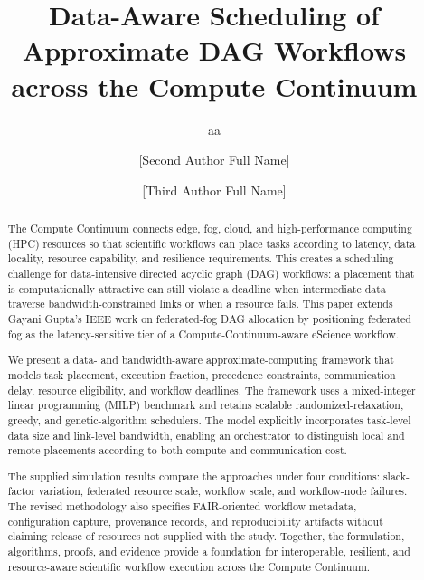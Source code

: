 \documentclass[a4paper,fleqn]{cas-dc}
\begin{document}
\let\WriteBookmarks\relax
\def\floatpagepagefraction{1}
\def\textpagefraction{.001}

\title[mode = title]{Data-Aware Scheduling of Approximate DAG Workflows across the Compute Continuum}

\author[1]{aa}
\cormark[1]

\author[1]{[Second Author Full Name]}

\author[2]{[Third Author Full Name]}


\begin{abstract}
The Compute Continuum connects edge, fog, cloud, and high-performance computing (HPC) resources so that scientific workflows can place tasks according to latency, data locality, resource capability, and resilience requirements. This creates a scheduling challenge for data-intensive directed acyclic graph (DAG) workflows: a placement that is computationally attractive can still violate a deadline when intermediate data traverse bandwidth-constrained links or when a resource fails. This paper extends Gayani Gupta's IEEE work on federated-fog DAG allocation by positioning federated fog as the latency-sensitive tier of a Compute-Continuum-aware eScience workflow.

We present a data- and bandwidth-aware approximate-computing framework that models task placement, execution fraction, precedence constraints, communication delay, resource eligibility, and workflow deadlines. The framework uses a mixed-integer linear programming (MILP) benchmark and retains scalable randomized-relaxation, greedy, and genetic-algorithm schedulers. The model explicitly incorporates task-level data size and link-level bandwidth, enabling an orchestrator to distinguish local and remote placements according to both compute and communication cost.

The supplied simulation results compare the approaches under four conditions: slack-factor variation, federated resource scale, workflow scale, and workflow-node failures. The revised methodology also specifies FAIR-oriented workflow metadata, configuration capture, provenance records, and reproducibility artifacts without claiming release of resources not supplied with the study. Together, the formulation, algorithms, proofs, and evidence provide a foundation for interoperable, resilient, and resource-aware scientific workflow execution across the Compute Continuum.
\end{abstract}
\end{document}
